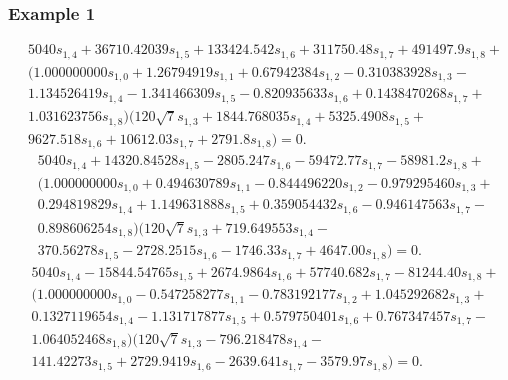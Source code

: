 \documentclass{beamer}
\begin{document}
\begin{frame}\frametitle{Example 1}
	\justifying
	\tiny
\begin{equation}\label{ch63bb}
\begin{aligned}
&5040s_{1,4}+36710.42039s_{1,5}+133424.542s_{1,6}+311750.48s_{1,7}+491497.9s_{1,8}+\\
&(1.000000000s_{1,0}+1.26794919s_{1,1}+0.67942384s_{1,2}-0.310383928s_{1,3}-\\
&1.134526419s_{1,4}-1.341466309s_{1,5}-0.820935633s_{1,6}+0.1438470268s_{1,7}+\\
&1.031623756s_{1,8}) (120 \sqrt{7}s_{1,3}+1844.768035s_{1,4}+5325.4908s_{1,5}+\\
&9627.518s_{1,6}+10612.03s_{1,7}+2791.8s_{1,8})=0.
\end{aligned}
\end{equation}
\normalsize
\tiny
\begin{equation}\label{ch63cc}
\begin{aligned}
&5040s_{1,4}+14320.84528s_{1,5}-2805.247s_{1,6}-59472.77s_{1,7}-58981.2s_{1,8}+\\
&(1.000000000s_{1,0}+0.494630789s_{1,1}-0.844496220s_{1,2}-0.979295460s_{1,3}+\\
&0.294819829s_{1,4}+1.149631888s_{1,5}+0.359054432s_{1,6}-0.946147563s_{1,7}-\\
&0.898606254s_{1,8}) (120 \sqrt{7}s_{1,3}+719.649553s_{1,4}-\\
&370.56278s_{1,5}-2728.2515s_{1,6}-1746.33s_{1,7}+4647.00s_{1,8})=0.
\end{aligned}
\end{equation}
\normalsize
\tiny
\begin{equation}\label{ch63dd}
\begin{aligned}
&5040s_{1,4}-15844.54765s_{1,5}+2674.9864s_{1,6}+57740.682s_{1,7}-81244.40s_{1,8}+\\
&(1.000000000s_{1,0}-0.547258277s_{1,1}-0.783192177s_{1,2}+1.045292682s_{1,3}+\\
&0.1327119654s_{1,4}-1.131717877s_{1,5}+0.579750401s_{1,6}+0.767347457s_{1,7}-\\
&1.064052468s_{1,8}) (120\sqrt{7}s_{1,3}-796.218478s_{1,4}-\\
&141.42273s_{1,5}+2729.9419s_{1,6}-2639.641s_{1,7}-3579.97s_{1,8})=0.
\end{aligned}
\end{equation}
\normalsize
\end{frame}
\end{document}

